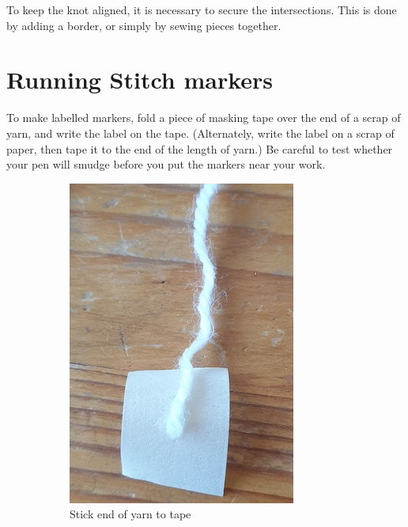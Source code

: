 \documentclass[openany]{book}
\begin{document}
To keep the knot aligned, it is necessary to secure the intersections. This is done by adding a border, or simply by sewing pieces together.


\section{Running Stitch markers}
To make labelled markers, fold a piece of masking tape over the end of a scrap of yarn, and write the label on the tape. (Alternately,
write the label on a scrap of paper, 
then tape it to the end of the length of yarn.) Be careful to test whether your pen will smudge before you put the markers near your work.
\begin{figure}[H]\centering
\begin{subfigure}[t]{.3\textwidth}
\includegraphics[width=.9\textwidth]{pic/M1}
\caption{Stick end of yarn to tape}
\end{subfigure}
%
\begin{subfigure}[t]{.3\textwidth}

\end{subfigure}
\end{figure}
\end{document}
